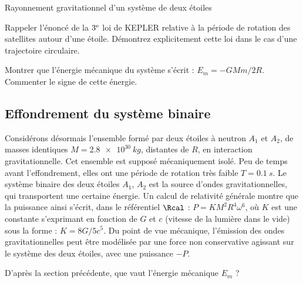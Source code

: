 \begin{exo}[PC][1][devoir]{Rayonnement gravitationnel d'un système de deux étoiles}
\begin{quest}
    \item  Rappeler l'énoncé de la $3^{\rm e}$ loi de KEPLER relative à la période de rotation des satellites
    autour d'une étoile.
    Démontrez explicitement cette loi dans le cas d'une trajectoire circulaire.


    \item Montrer que l'énergie mécanique du système s'écrit : $E_m = -GMm/2R$.
    Commenter le signe de cette énergie.


    \end{quest}


    \subsection{Effondrement du système binaire}
    Considérons désormais l'ensemble formé par deux étoiles à neutron $A_1$ et $A_2$, de masses identiques $M={\SI{2.8e30}{kg}}$, distantes de $R$, en interaction
    gravitationnelle. Cet ensemble est supposé mécaniquement isolé. Peu de temps avant
    l'effondrement, elles ont une période de rotation très faible $T = \SI{0,1}{s}$. Le système binaire des deux étoiles $A_1$, $A_2$ est la source d'ondes gravitationnelles, qui transportent
    une certaine énergie. Un calcul de relativité générale montre que la puissance ainsi  s'écrit, dans le référentiel $\Rcal$ :
    $P = KM^2R^4\omega^6$, où $K$ est une constante s'exprimant en fonction de $G$ et $c$ (vitesse de la lumière
    dans le vide) sous la forme : $K= 8G/5c^5$.  Du point de vue mécanique,
    l'émission des ondes gravitationnelles peut être modélisée par une force non conservative agissant
    sur le système des deux étoiles, avec une puissance $-P$.

    \begin{quest}
    \item D'après la section précédente, que vaut l'énergie mécanique $E_m$ ?


\end{quest}
\end{exo}
